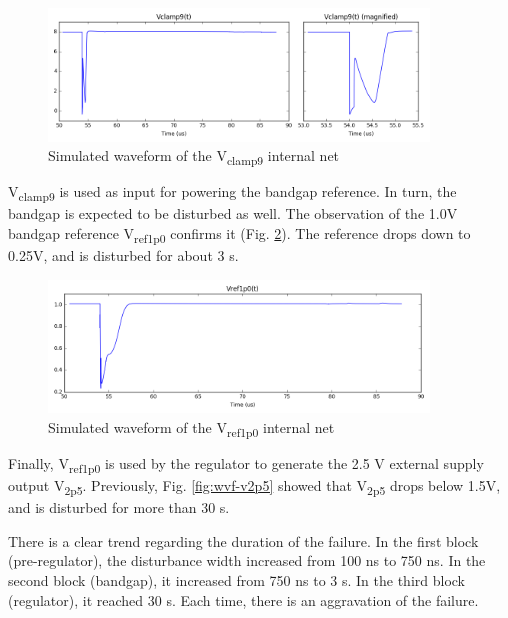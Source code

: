 \begin{figure}[!h]
  \centering
  \includegraphics[width=0.9\textwidth]{src/3/figures/vclamp9.png}
  \caption{Simulated waveform of the V\textsubscript{clamp9} internal net}
  \label{fig:wvf-vclamp9}
\end{figure}

V\textsubscript{clamp9} is used as input for powering the bandgap reference.
In turn, the bandgap is expected to be disturbed as well.
The observation of the 1.0V bandgap reference V\textsubscript{ref1p0} confirms it (Fig. \ref{fig:wvf-v1p0}).
The reference drops down to 0.25V, and is disturbed for about 3 \textmugreek{}s.

\begin{figure}[!h]
  \centering
  \includegraphics[width=0.9\textwidth]{src/3/figures/v1p0.png}
  \caption{Simulated waveform of the V\textsubscript{ref1p0} internal net}
  \label{fig:wvf-v1p0}
\end{figure}

Finally, V\textsubscript{ref1p0} is used by the regulator to generate the 2.5 V external supply output V\textsubscript{2p5}.
Previously,  Fig. \ref{fig:wvf-v2p5} showed that V\textsubscript{2p5} drops below 1.5V, and is disturbed for more than 30 \textmugreek{}s.

There is a clear trend regarding the duration of the failure.
In the first block (pre-regulator), the disturbance width increased from 100 ns to 750 ns.
In the second block (bandgap), it increased from 750 ns to 3 \textmugreek{}s.
In the third block (regulator), it reached 30 \textmugreek{}s.
Each time, there is an aggravation of the failure.

